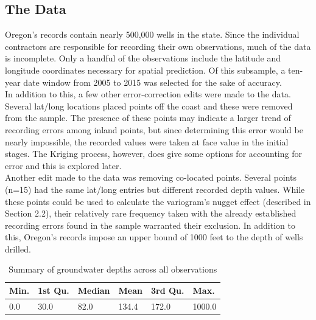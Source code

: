 \documentclass[12pt,twoside]{reedthesis}
\begin{document}
\subsection{The Data}

Oregon's records contain nearly 500,000 wells in the state. Since the individual contractors are responsible for recording their own observations, much of the data is incomplete. Only a handful of the observations include the latitude and longitude coordinates necessary for spatial prediction. Of this subsample, a ten-year date window from 2005 to 2015 was selected for the sake of accuracy. \\

In addition to this, a few other error-correction edits were made to the data. Several lat/long locations placed points off the coast and these were removed from the sample. The presence of these points may indicate a larger trend of recording errors among inland points, but since determining this error would be nearly impossible, the recorded values were taken at face value in the initial stages. The Kriging process, however, does give some options for accounting for error and this is explored later. \\

Another edit made to the data was removing co-located points. Several points (n=15) had the same lat/long entries but different recorded depth values. While these points could be used to calculate the variogram's nugget effect (described in Section 2.2), their relatively rare frequency taken with the already established recording errors found in the sample warranted their exclusion. In addition to this, Oregon's records impose an upper bound of 1000 feet to the depth of wells drilled.

\begin{table}[h]

	\centering
	

 \begin{tabular}{l|l|l|l|l|l}

\hline
Min. & 1st Qu. & Median & Mean & 3rd Qu. & Max. \\
\hline
0.0  & 30.0  & 82.0  & 134.4  & 172.0  & 1000.0  \\
\hline



\end{tabular}
\label{data}
\caption{Summary of groundwater depths across all observations}

\end{table}
\end{document}
